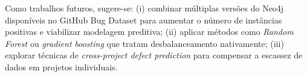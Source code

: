 \documentclass[12pt]{article}
\begin{document}
Como trabalhos futuros, sugere-se: (i) combinar múltiplas versões do Neo4j disponíveis no GitHub Bug Dataset para aumentar o número de instâncias positivas e viabilizar modelagem preditiva; (ii) aplicar métodos como \textit{Random Forest} ou \textit{gradient boosting} que tratam desbalanceamento nativamente; (iii) explorar técnicas de \textit{cross-project defect prediction} para compensar a escassez de dados em projetos individuais.



\end{document}
